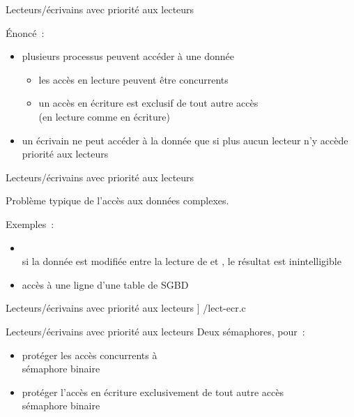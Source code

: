 \begin {frame} {Lecteurs/écrivains avec priorité aux lecteurs}

    Énoncé~:

    \begin {itemize}
	\item plusieurs processus peuvent accéder à une donnée
	    \begin {itemize}
		\item les accès en lecture peuvent être concurrents
		\item un accès en écriture est exclusif de tout autre
		    accès \\
		    (en lecture comme en écriture)
	    \end {itemize}

	\item un écrivain ne peut accéder à la donnée que si plus
	    aucun lecteur n'y accède
	    \\
	    \implique priorité aux lecteurs

    \end {itemize}

\end {frame}

\begin {frame} {Lecteurs/écrivains avec priorité aux lecteurs}

    Problème typique de l'accès aux données complexes.

    \vspace* {3mm}

    Exemples~:
    \begin {itemize}
	\item {}
	    \\
	    \implique si la donnée est modifiée entre la lecture de
	     et 
	    ,
	    le résultat est inintelligible

	\item accès à une ligne d'une table de SGBD

    \end {itemize}

\end {frame}

\begin {frame} {Lecteurs/écrivains avec priorité aux lecteurs}
    \scriptsize\lstmonstyle] {\inc/lect-ecr.c}
\end {frame}

\begin {frame} {Lecteurs/écrivains avec priorité aux lecteurs}
    Deux sémaphores, pour~:

    \begin {itemize}
	\item protéger les accès concurrents à 
	    \\
	    \implique sémaphore binaire

	\item protéger l'accès en écriture exclusivement de tout
	    autre accès
	    \\
	    \implique sémaphore binaire

    \end {itemize}
\end {frame}

